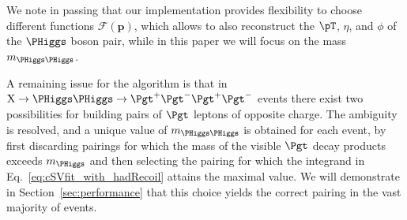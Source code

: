 We note in passing that our implementation provides flexibility to choose different functions $\mathcal{F}(\bm{p})$, 
which allows to also reconstruct the $\pT$, $\eta$, and $\phi$ of the $\PHiggs$ boson pair,
while in this paper we will focus on the mass $m_{\PHiggs\PHiggs}$.

A remaining issue for the algorithm is that in $\textrm{X} \to \PHiggs\PHiggs \to \Pgt^{+}\Pgt^{-}\Pgt^{+}\Pgt^{-}$ events 
there exist two possibilities for building pairs of $\Pgt$ leptons of opposite charge.
The ambiguity is resolved, and a unique value of $m_{\PHiggs\PHiggs}$ is obtained for each event, 
by first discarding pairings for which the mass of the visible $\Pgt$ decay products exceeds $m_{\PHiggs}$
and then selecting the pairing for which the integrand in Eq.~\ref{eq:cSVfit_with_hadRecoil} attains the maximal value.
We will demonstrate in Section~\ref{sec:performance} that this choice yields the correct pairing in the vast majority of events.

